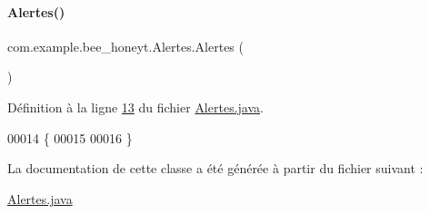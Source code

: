 \paragraph{\texorpdfstring{Alertes()}{Alertes()}}
{\footnotesize\ttfamily com.\+example.\+bee\+\_\+honeyt.\+Alertes.\+Alertes (\begin{DoxyParamCaption}{ }\end{DoxyParamCaption})}



Définition à la ligne \hyperlink{_alertes_8java_source_l00013}{13} du fichier \hyperlink{_alertes_8java_source}{Alertes.\+java}.


\begin{DoxyCode}
00014     \{
00015 
00016     \}
\end{DoxyCode}


La documentation de cette classe a été générée à partir du fichier suivant \+:\begin{DoxyCompactItemize}
\item 
\hyperlink{_alertes_8java}{Alertes.\+java}\end{DoxyCompactItemize}

